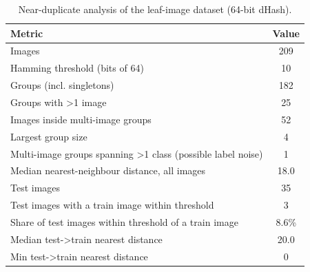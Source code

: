 \begin{table}[t]
\centering
\caption{Near-duplicate analysis of the leaf-image dataset (64-bit dHash).}
\label{tab:leakage}
\begin{tabular}{lc}
\toprule
Metric & Value \\
\midrule
Images & 209 \\
Hamming threshold (bits of 64) & 10 \\
Groups (incl. singletons) & 182 \\
Groups with >1 image & 25 \\
Images inside multi-image groups & 52 \\
Largest group size & 4 \\
Multi-image groups spanning >1 class (possible label noise) & 1 \\
Median nearest-neighbour distance, all images & 18.0 \\
Test images & 35 \\
Test images with a train image within threshold & 3 \\
Share of test images within threshold of a train image & 8.6\% \\
Median test->train nearest distance & 20.0 \\
Min test->train nearest distance & 0 \\
\bottomrule
\end{tabular}
\end{table}